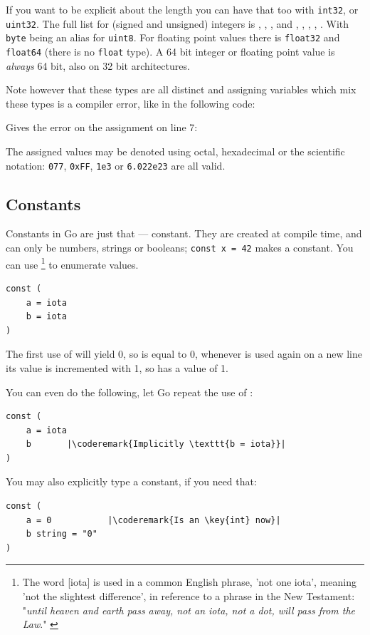 If you want to be explicit about the length you can have
that too with \lstinline{int32}, or \lstinline{uint32}. The full
list for (signed and unsigned) integers is
, , ,  and
, , , , .
With \lstinline{byte} being an
alias for \lstinline{uint8}. For floating point values there is
\lstinline{float32} and \lstinline{float64} (there is no \lstinline{float} type). 
A 64 bit integer or floating point value is \emph{always} 64 bit, also on 32 bit
architectures.

Note however
that these types are all distinct and assigning variables which mix
these types is a compiler error, like in the following code:

Gives the error on the assignment on line 7:

\noindent{}

The assigned values may be denoted using octal, hexadecimal or the scientific notation:
\lstinline{077}, \lstinline{0xFF}, \lstinline{1e3} or
\mbox{\lstinline{6.022e23}} are all valid.

\subsection{Constants}
\label{sec:constants}
Constants in Go are just that --- constant. They are created at compile
time, and can only be numbers, strings or booleans;
\lstinline{const x = 42} makes  a constant. You can use
 \footnote{The word [iota] is used in a common English phrase,
'not one iota', meaning 'not the slightest difference', in reference to
a phrase in the New Testament: "\emph{until heaven and earth pass away, not an
iota, not a dot, will pass from the Law}." \cite{iota}}
to enumerate values.
\begin{lstlisting}
const (
	a = iota
	b = iota 
)
\end{lstlisting}
The first use of  will yield 0, so  is equal to 0, whenever
 is used again on a new line its value is incremented with 1, so 
has a value of 1.

You can even do the following, let Go repeat the use of :
\begin{lstlisting}
const (
	a = iota
	b	    |\coderemark{Implicitly \texttt{b = iota}}|
)
\end{lstlisting}
You may also explicitly type a constant, if you need that:
\begin{lstlisting}
const (
	a = 0           |\coderemark{Is an \key{int} now}|
	b string = "0" 
)
\end{lstlisting}

